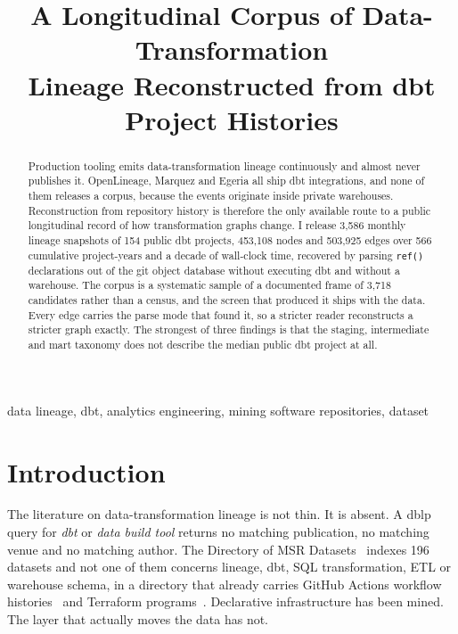\documentclass[10pt,conference]{IEEEtran}
\begin{document}
\title{A Longitudinal Corpus of Data-Transformation\\Lineage Reconstructed from dbt Project Histories}

\author{
}

\maketitle

\begin{abstract}
Production tooling emits data-transformation lineage continuously and almost
never publishes it. OpenLineage, Marquez and Egeria all ship dbt integrations,
and none of them releases a corpus, because the events originate inside private
warehouses. Reconstruction from repository history is therefore the only
available route to a public longitudinal record of how transformation graphs
change. I release 3{,}586 monthly lineage snapshots of 154 public dbt projects,
453{,}108 nodes and 503{,}925 edges over 566 cumulative project-years and a
decade of wall-clock time, recovered by parsing \texttt{ref()} declarations out
of the git object database without executing dbt and without a warehouse. The
corpus is a systematic sample of a documented frame of 3{,}718 candidates rather
than a census, and the screen that produced it ships with the data. Every edge
carries the parse mode that found it, so a stricter reader reconstructs a
stricter graph exactly. The strongest of three findings is that the staging,
intermediate and mart taxonomy does not describe the median public dbt project
at all.
\end{abstract}

\begin{IEEEkeywords}
data lineage, dbt, analytics engineering, mining software repositories, dataset
\end{IEEEkeywords}

\section{Introduction}

The literature on data-transformation lineage is not thin. It is absent. A dblp
query for \emph{dbt} or \emph{data build tool} returns no matching publication,
no matching venue and no matching author. The Directory of MSR
Datasets~\cite{msrdirectory} indexes 196 datasets and not one of them concerns
lineage, dbt, SQL transformation, ETL or warehouse schema, in a directory that
already carries GitHub Actions workflow histories~\cite{cardoen2024} and
Terraform programs~\cite{terrads2025}. Declarative infrastructure has been
mined. The layer that actually moves the data has not.
\end{document}
